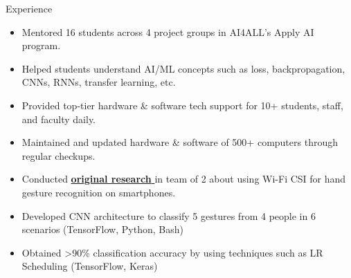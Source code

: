 \documentclass{resume} %
\begin{document}
\begin{workSection}{Experience}
    \experienceItem[
        company=AI4ALL,
        location=Remote,
        position=Student Coordinator,
        duration=August 2023 {-} Present
    ]
    \begin{itemize}
        \vspace{-0.5em}
        \itemsep -6pt {}
        \item Mentored 16 students across 4 project groups in AI4ALL's Apply AI program.
        \item Helped students understand AI/ML concepts such as loss, backpropagation, CNNs, RNNs, transfer learning, etc.
    \end{itemize}
    \experienceItem[
        company=UTEP,
        location=El Paso{,} TX,
        position=Tech Support Staff,
        duration=January 2023 {-} Present
    ]
    \begin{itemize}
        \vspace{-0.5em}
        \itemsep -6pt {}
        \item Provided top-tier hardware \& software tech support for 10+ students, staff, and faculty daily.
        \item Maintained and updated hardware \& software of 500+ computers through regular checkups.
    \end{itemize}
    \experienceItem[
    company=Temple University,
    location=Philadelphia{,} PA,
    position=Undergraduate Researcher,
    duration=June {-} July 2023
    ]
    \begin{itemize}
        \vspace{-0.5em}
        \itemsep -6pt {}
        \item Conducted \href{https://drive.google.com/file/d/1HG4S5iSNb0nX2yN3LfSsRilemFDamnaN/view?usp=sharing}{\textbf{original research} \faExternalLink} in team of 2 about using Wi-Fi CSI for hand gesture recognition on smartphones.
        \item Developed CNN architecture to classify 5 gestures from 4 people in 6 scenarios (TensorFlow, Python, Bash)
        \item Obtained >90\% classification accuracy by using techniques such as LR Scheduling (TensorFlow, Keras)
    \end{itemize}

\end{workSection}
\end{document}
